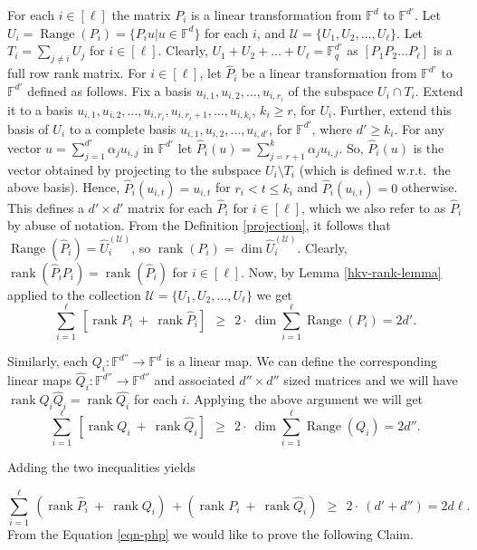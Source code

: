 \documentclass[10pt,a4paper]{article}
\DeclareMathOperator{\range}{Range}
\newcommand{\op}[1]{\ensuremath{\operatorname{#1}}}
\newcommand{\F}{\mathbb{F}}
\newcommand{\rank}{\op{rank}}
\begin{document}
For each $i\in [\ell]$ the matrix $P_i$ is a linear transformation
from $\F^d$ to $\F^{d'}$. Let $U_i= \range(P_i)=\{P_i u | u \in
\F^{d}\}$ for each $i$, and $\mathcal{U}= \{U_1, U_2, \ldots, U_{\ell}
\}$. Let $T_i = \sum _{j \neq i} U_j$ for $i\in [\ell]$. Clearly,
$U_1+ U_2 + \ldots + U_\ell= \mathbb{F}_q^{d'}$ as $[ P_1 P_2\ldots
  P_\ell]$ is a full row rank matrix. For $i\in[\ell]$, let
$\hat{P}_i$ be a linear transformation from $\mathbb{F}^{d'}$ to
$\mathbb{F}^{d'}$ defined as follows. Fix a basis $u_{i,1}, u_{i,2},
\ldots, u_{i,r_i}$ of the subspace $U_i \cap T_i$. Extend it to a
basis $u_{i,1}, u_{i,2}, \ldots, u_{i,r_i}, u_{i,r_i+1}, \ldots,
u_{i,k_i}$, $k_i \geq r$, for $U_i$. Further, extend this basis of
$U_i$ to a complete basis $u_{i,1}, u_{i,2}, \ldots, u_{i,d'}$, for
$\mathbb{F}^{d'}$, where $d' \geq k_i$. For any vector $u =
\sum_{j=1}^{d'} \alpha_j u_{i,j}$ in $\mathbb{F}^{d'}$ let $\hat{P}_i
(u) = \sum_{j=r+1}^k \alpha_j u_{i,j}$. So, $\hat{P}_i(u)$ is the
vector obtained by projecting to the subspace $U_i\setminus T_i$
(which is defined w.r.t.\ the above basis). Hence,
$\hat{P}_i(u_{i,t})= u_{i,t}$ for $r_i < t \leq k_i$ and
$\hat{P}_i(u_{i,t})= 0$ otherwise. This defines a $d' \times d'$
matrix for each $\hat{P}_i$ for $i \in [\ell]$, which we also refer to
as $\hat{P}_i$ by abuse of notation. From the Definition
\ref{projection}, it follows that $\range(\hat{P}_i) =
\hat{U}_i^{(\mathcal{U})}$, so $\rank(P_i)=\dim
\hat{U}_i^{(\mathcal{U})}$.  Clearly, $\rank(\hat{P}_i P_i) =
\rank(\hat{P}_i)$ for $i \in [\ell]$. Now, by Lemma
\ref{hkv-rank-lemma} applied to the collection $\mathcal{U}= \{U_1,
U_2, \ldots, U_{\ell} \}$ we get
\[
\sum_{i=1}^{\ell}~ \left[ \rank P_i ~+~ \rank \hat{P}_i \right]~~ \geq
~~ 2\cdot ~ \dim \sum_{i=1}^{\ell} \range(P_i) = 2d'.
\]      

Similarly, each $Q_i:\F^{d''}\to \F^d$ is a linear map. We can define
the corresponding linear maps $\hat{Q}_i : \mathbb{F}^{d''} \to
\mathbb{F}^{d''}$ and associated $d'' \times d''$ sized matrices and
we will have $\rank Q_i\hat{Q}_i = \rank \hat{Q_i}$ for each
$i$. Applying the above argument we will get
 \[
\sum_{i=1}^{\ell}~ \left[ \rank Q_i ~+~ \rank \hat{Q}_i \right]~~ \geq
~~ 2\cdot ~ \dim \sum_{i=1}^{\ell} \range(Q_i) = 2d''.
\] 

Adding the two inequalities yields

\begin{equation}\label{eqn-php}
\sum_{i=1}^{\ell}~ \left( \rank \hat{P}_i ~+~ \rank Q_i \right)~ +  \left( \rank {P}_i ~+~ \rank \hat{Q}_i \right) ~~\geq ~~ 2\cdot ~ (d'+d'')= 2d\ell.
\end{equation}
From the Equation \ref{eqn-php} we would like to prove the following Claim.
\end{document}
